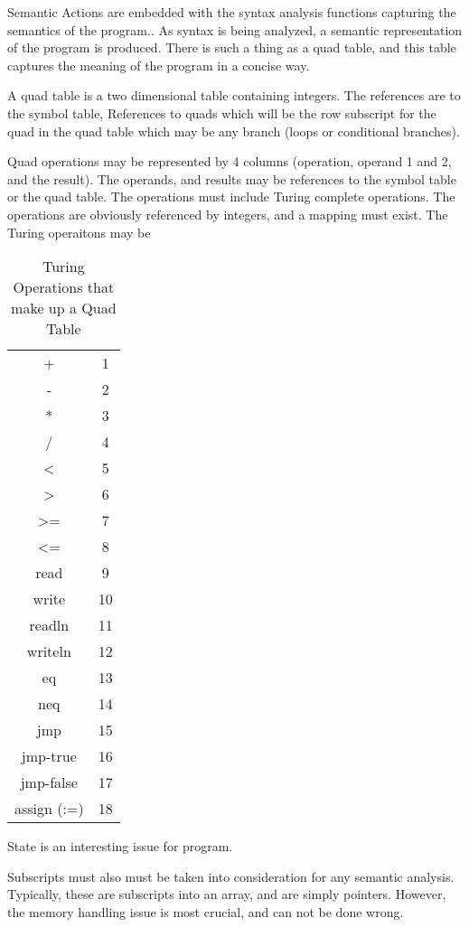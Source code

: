 Semantic Actions are embedded with the syntax analysis functions capturing the semantics of the program.. As syntax is being analyzed, a semantic representation of the program is produced.    There is such a thing as a quad table, and this table captures the meaning of the program in a concise way. 

A quad table is a two dimensional table containing integers.  The references are to the symbol table,   References to quads which will be the row subscript for the quad in the quad table which may be any branch (loops or conditional branches).  

Quad operations may be represented by 4 columns (operation, operand 1 and 2, and the result).  The operands, and results may be references to the symbol table or the quad table.   The operations must include Turing complete operations.  The operations are obviously referenced by integers, and a mapping must exist.  The Turing operaitons may be
\begin{table}[htdp]
\caption{Turing Operations that make up a Quad Table}
\begin{center}
\begin{tabular}{|c|c|}
+ 	& 1 \\
-	& 2 \\
*	& 3 \\
/	& 4 \\
< 	& 5 \\
> 	& 6  \\
>=	& 7	\\
<= 	& 8 	\\
read	&	9	\\
write	&	10	\\
readln	&	11 \\
writeln	&	12 \\
eq		&	13	\\
neq		&	14	\\
jmp		& 	15	\\
jmp-true	&	16	\\
jmp-false	&	17	\\
assign (:=)	&	18	\\
\end{tabular}
\end{center}
\label{default}
\end{table}%

State is an interesting issue for program.

Subscripts must also must be taken into consideration for any semantic analysis.  Typically, these are subscripts into an array, and are simply pointers.  However, the memory handling issue is most crucial, and can not be done wrong.

